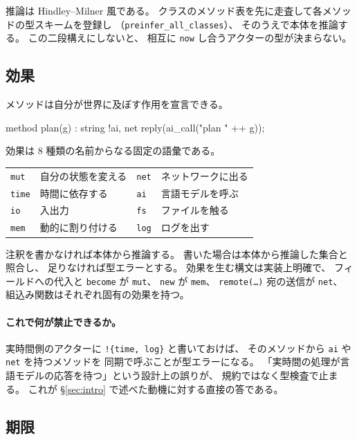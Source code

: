 \documentclass[11pt,a4paper]{ltjsarticle}
\theoremstyle{definition}
\theoremstyle{remark}
\begin{document}
推論は Hindley--Milner 風である。
クラスのメソッド表を先に走査して各メソッドの型スキームを登録し
（\texttt{preinfer\_all\_classes}）、
そのうえで本体を推論する。
この二段構えにしないと、
相互に \texttt{now} し合うアクターの型が決まらない。

\subsection{効果}

メソッドは自分が世界に及ぼす作用を宣言できる。

\begin{aipl}
method plan(g) : string !{ai, net} { reply(ai_call("plan " ++ g)); }
\end{aipl}

効果は 8 種類の名前からなる固定の語彙である。

\begin{center}
\begin{tabular}{ll@{\qquad}ll}
\toprule
\texttt{mut}  & 自分の状態を変える    & \texttt{net} & ネットワークに出る \\
\texttt{time} & 時間に依存する        & \texttt{ai}  & 言語モデルを呼ぶ \\
\texttt{io}   & 入出力                & \texttt{fs}  & ファイルを触る \\
\texttt{mem}  & 動的に割り付ける      & \texttt{log} & ログを出す \\
\bottomrule
\end{tabular}
\end{center}

注釈を書かなければ本体から推論する。
書いた場合は本体から推論した集合と照合し、
足りなければ型エラーとする。
効果を生む構文は実装上明確で、
フィールドへの代入と \texttt{become} が \texttt{mut}、
\texttt{new} が \texttt{mem}、
\texttt{remote(\ldots)} 宛の送信が \texttt{net}、
組込み関数はそれぞれ固有の効果を持つ。

\paragraph{これで何が禁止できるか。}
実時間側のアクターに \texttt{!\{time, log\}} と書いておけば、
そのメソッドから \texttt{ai} や \texttt{net} を持つメソッドを
同期で呼ぶことが型エラーになる。
「実時間の処理が言語モデルの応答を待つ」という設計上の誤りが、
規約ではなく型検査で止まる。
これが \S\ref{sec:intro} で述べた動機に対する直接の答である。

\subsection{期限}
\end{document}
